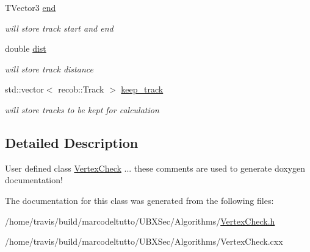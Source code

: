 \begin{DoxyCompactItemize}
\item 
\hypertarget{classubxsec_1_1VertexCheck_ad416fe53ee649eb9a9e310e9abe32a0b}{T\-Vector3 \hyperlink{classubxsec_1_1VertexCheck_ad416fe53ee649eb9a9e310e9abe32a0b}{end}}\label{classubxsec_1_1VertexCheck_ad416fe53ee649eb9a9e310e9abe32a0b}

\begin{DoxyCompactList}\small\item\em will store track start and end \end{DoxyCompactList}\item 
\hypertarget{classubxsec_1_1VertexCheck_aaa817d271e0bb5e44d07ef5c21ad52cc}{double \hyperlink{classubxsec_1_1VertexCheck_aaa817d271e0bb5e44d07ef5c21ad52cc}{dist}}\label{classubxsec_1_1VertexCheck_aaa817d271e0bb5e44d07ef5c21ad52cc}

\begin{DoxyCompactList}\small\item\em will store track distance \end{DoxyCompactList}\item 
\hypertarget{classubxsec_1_1VertexCheck_a6046f472792f70321896604580b758e6}{std\-::vector$<$ recob\-::\-Track $>$ \hyperlink{classubxsec_1_1VertexCheck_a6046f472792f70321896604580b758e6}{keep\-\_\-track}}\label{classubxsec_1_1VertexCheck_a6046f472792f70321896604580b758e6}

\begin{DoxyCompactList}\small\item\em will store tracks to be kept for calculation \end{DoxyCompactList}\end{DoxyCompactItemize}


\subsection{Detailed Description}
User defined class \hyperlink{classubxsec_1_1VertexCheck}{Vertex\-Check} ... these comments are used to generate doxygen documentation! 

The documentation for this class was generated from the following files\-:\begin{DoxyCompactItemize}
\item 
/home/travis/build/marcodeltutto/\-U\-B\-X\-Sec/\-Algorithms/\hyperlink{VertexCheck_8h}{Vertex\-Check.\-h}\item 
/home/travis/build/marcodeltutto/\-U\-B\-X\-Sec/\-Algorithms/Vertex\-Check.\-cxx\end{DoxyCompactItemize}
